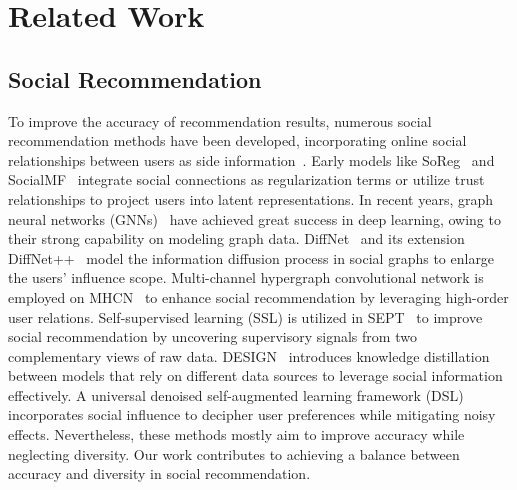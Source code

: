 \section{Related Work}
\subsection{Social Recommendation}
To improve the accuracy of recommendation results, numerous social recommendation methods have been developed, incorporating online social relationships between users as side information~\cite{guo2015trustsvd,li2021spex}. Early models like SoReg~\cite{ma2011recommender} and SocialMF~\cite{jamali2010matrix} integrate social connections as regularization terms or utilize trust relationships to project users into latent representations. In recent years, graph neural networks (GNNs)~\cite{kipf2016semi} have achieved great success in deep learning, owing to their strong capability on modeling graph data. DiffNet~\cite{wu2019neural} and its extension DiffNet++~\cite{wu2020diffnet++} model the information diffusion process in social graphs to enlarge the users’ influence scope. Multi-channel hypergraph convolutional network is employed on MHCN~\cite{yu2021self} to enhance social recommendation by leveraging high-order user relations. Self-supervised learning (SSL) is utilized in SEPT~\cite{yu2021socially} to improve social recommendation by uncovering supervisory signals from two complementary views of raw data. DESIGN~\cite{tao2022revisiting} introduces knowledge distillation between models that rely on different data sources to leverage social information effectively. A universal denoised self-augmented learning framework (DSL)~\cite{wang2023denoised} incorporates social influence to decipher user preferences while mitigating noisy effects. Nevertheless, these methods mostly aim to improve accuracy while neglecting diversity. Our work contributes to achieving a balance between accuracy and diversity in social recommendation.
 
